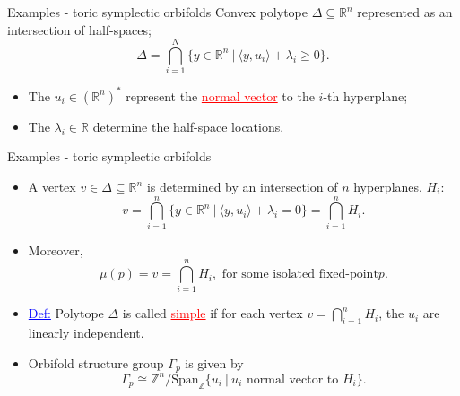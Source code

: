 \documentclass[aspectratio=169,xcolor=dvipsnames]{beamer}
\newcommand{\ZZ}{\mathbb{Z}}
\newcommand{\RR}{\mathbb{R}}
\newcommand{\Span}{\text{Span}}
\begin{document}
\begin{frame}{Examples - toric symplectic orbifolds}
	Convex polytope $\Delta \subseteq \RR^{n}$ represented as an intersection of half-spaces;
	\[
		\Delta = \bigcap_{i=1}^{N} \{ y \in \RR^{n}~|~\langle y, u_{i}\rangle + \lambda_{i} \geq 0 \}.
	\]
	\begin{itemize}
		\item The $u_{i} \in (\RR^{n})^{\ast}$ represent the \textcolor{red}{\underline{normal vector}} to the $i$-th hyperplane;
		\item The $\lambda_{i} \in \RR$ determine the half-space locations.
	\end{itemize}

	\begin{figure}[h!]
		\centering
	\end{figure}
\end{frame}

\begin{frame}{Examples - toric symplectic orbifolds}
    \begin{itemize}
        \item A vertex $v \in \Delta \subseteq \RR^{n}$ is determined by an intersection of $n$ hyperplanes, $H_{i}$:
        \[
        v = \bigcap_{i=1}^{n} \{ y \in \RR^{n}~|~\langle y, u_{i}\rangle + \lambda_{i} = 0 \} = \bigcap_{i=1}^{n} H_{i}.
        \]
        \item Moreover,
        \[
        \mu(p) = v = \bigcap_{i=1}^{n}H_{i}, \text{ for some isolated fixed-point} p.
        \]
        \item \textcolor{blue}{\underline{Def:}} Polytope $\Delta$ is called \textcolor{red}{\underline{simple}} if for each vertex $v = \bigcap_{i=1}^{n}H_{i}$, the $u_{i}$ are linearly independent.
        \item Orbifold structure group $\Gamma_{p}$ is given by
        \[
        \Gamma_{p} \cong \ZZ^{n} / \Span_{\ZZ}\{u_{i}~|~u_{i} \text{ normal vector to } H_{i} \}.
        \]
    \end{itemize}	
\end{frame}
\end{document}
